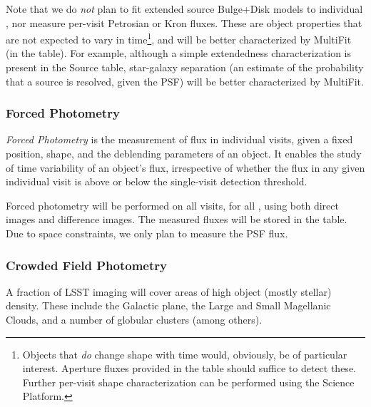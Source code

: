 \documentclass[SE,lsstdraft,toc]{lsstdoc}
\begin{document}
Note that we do \emph{not} plan to fit extended source Bulge+Disk models to individual \Sources, nor measure per-visit Petrosian or Kron fluxes. These are object properties that are not expected to vary in time\footnote{Objects that \emph{do} change shape with time would, obviously, be of particular interest. Aperture fluxes provided in the \Source table should suffice to detect these. Further per-visit shape characterization can be performed using the Science Platform.}, and will be better characterized by MultiFit (in the \Object table).
For example, although a simple extendedness characterization is present in the Source table, star-galaxy separation (an estimate of the probability that a source is resolved, given the PSF) will be better characterized by MultiFit.


\subsubsection{Forced Photometry}
\label{sec:forcedPhotL2}

\emph{Forced Photometry} is the measurement of flux in individual visits, given a fixed position, shape, and the deblending parameters of an object. It enables the study of time variability of an object's flux, irrespective of whether the flux in any given individual visit is above or below the single-visit detection threshold.

Forced photometry will be performed on all visits, for all \Objects, using both direct images and difference images.
The measured fluxes will be stored in the \ForcedSources table. Due to space constraints, we only plan to measure the PSF flux.

\subsubsection{Crowded Field Photometry}

A fraction of LSST imaging will cover areas of high object (mostly stellar) density. These include the Galactic plane, the Large and Small Magellanic Clouds, and a number of globular clusters (among others).

\end{document}
